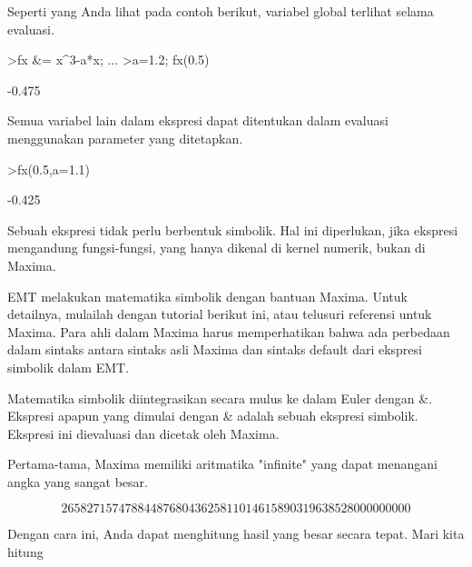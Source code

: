 \documentclass[a4paper,10pt]{article}
\begin{document}
\begin{eulernotebook}
\begin{eulercomment}
Seperti yang Anda lihat pada contoh berikut, variabel global terlihat
selama evaluasi.
\end{eulercomment}
\begin{eulerprompt}
>fx &= x^3-a*x;  ...
>a=1.2; fx(0.5)
\end{eulerprompt}
\begin{euleroutput}
  -0.475
\end{euleroutput}
\begin{eulercomment}
Semua variabel lain dalam ekspresi dapat ditentukan dalam evaluasi
menggunakan parameter yang ditetapkan.
\end{eulercomment}
\begin{eulerprompt}
>fx(0.5,a=1.1)
\end{eulerprompt}
\begin{euleroutput}
  -0.425
\end{euleroutput}
\begin{eulercomment}
Sebuah ekspresi tidak perlu berbentuk simbolik. Hal ini diperlukan,
jika ekspresi mengandung fungsi-fungsi, yang hanya dikenal di kernel
numerik, bukan di Maxima.

\end{eulercomment}
\begin{eulercomment}
EMT melakukan matematika simbolik dengan bantuan Maxima. Untuk
detailnya, mulailah dengan tutorial berikut ini, atau telusuri
referensi untuk Maxima. Para ahli dalam Maxima harus memperhatikan
bahwa ada perbedaan dalam sintaks antara sintaks asli Maxima dan
sintaks default dari ekspresi simbolik dalam EMT.

Matematika simbolik diintegrasikan secara mulus ke dalam Euler dengan
\&. Ekspresi apapun yang dimulai dengan \& adalah sebuah ekspresi
simbolik. Ekspresi ini dievaluasi dan dicetak oleh Maxima.

Pertama-tama, Maxima memiliki aritmatika "infinite" yang dapat
menangani angka yang sangat besar.
\end{eulercomment}
\begin{eulerformula}
\[
2658271574788448768043625811014615890319638528000000000
\]
\end{eulerformula}
\begin{eulercomment}
Dengan cara ini, Anda dapat menghitung hasil yang besar secara tepat.
Mari kita hitung


\end{eulercomment}
\end{eulernotebook}
\end{document}
